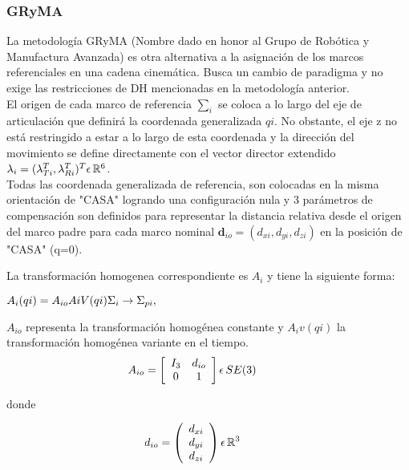 \documentclass[journal]{IEEEtran}
\begin{document}
    \subsubsection{GRyMA}
    \noindent La metodología GRyMA (Nombre dado en honor al Grupo de Robótica y Manufactura Avanzada) es otra alternativa
    a la asignación de los marcos referenciales en una cadena cinemática. Busca un cambio de paradigma y no exige las
    restricciones de DH mencionadas en la metodología anterior. \\ 
    \noindent El origen de cada marco de referencia $ \sum_i$ se coloca a lo largo del eje de articulación que definirá
    la coordenada generalizada $ qi$. No obstante, el eje z no está restringido a estar a lo largo de esta coordenada
    y la dirección del movimiento se define directamente con el vector director extendido
    $ \lambda_i=(\lambda_{Ti}^T, \lambda_{Ri}^T)^T \epsilon \thinspace \mathbb{R}^6 $.  \\ 
    \noindent Todas las coordenada generalizada de referencia, son colocadas en la misma orientación de "CASA" logrando
    una configuración nula y 3 parámetros de compensación son definidos para representar la distancia relativa desde el
    origen del marco padre para cada marco nominal $ \mathbf{d}_{io}=(d_{xi}, d_{yi}, d_{zi})$ en la posición de "CASA"
    (q=0).

    La transformación homogenea correspondiente es $A_i$ y tiene la siguiente forma:

    $A_i(qi)=A_{io}A{iV}(qi) \hfill \Sigma_i \rightarrow \Sigma_{pi},$

    $A_{io}$ representa la transformación homogénea constante y $A_iv(qi)$ la transformación homogénea variante en el
    tiempo.
    \begin{equation*}
        \hspace{-10mm}
        A_{io} = \left[
            \begin{array}{cc}
                I_{3} & d_{io}\\
                0 & 1\\
            \end{array}\right]  \epsilon \thinspace SE(3) 
    \end{equation*} 

    donde 

    \begin{equation*}
        \hspace{-10mm}
        d_{io} = \left(
            \begin{array}{c}
                d_{xi}\\
                d_{yi}\\
                d_{zi}\\
            \end{array}\right) \epsilon \thinspace \mathbb{R}^3 
    \end{equation*} 
\end{document}

